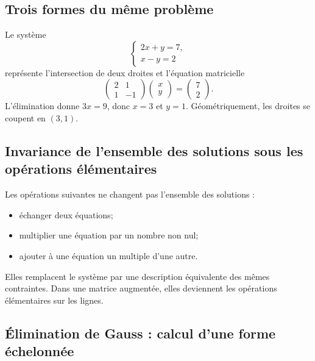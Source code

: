 \subsection{Trois formes du même problème}

Le système
\[
\begin{cases}
2x+y=7,\\
x-y=2
\end{cases}
\]
représente l'intersection de deux droites et l'équation matricielle
\[
\begin{pmatrix}2&1\\1&-1\end{pmatrix}
\begin{pmatrix}x\\y\end{pmatrix}
=
\begin{pmatrix}7\\2\end{pmatrix}.
\]
L'élimination donne $3x=9$, donc $x=3$ et $y=1$. Géométriquement, les droites se coupent en $(3,1)$.

\subsection{Invariance de l'ensemble des solutions sous les opérations élémentaires}

Les opérations suivantes ne changent pas l'ensemble des solutions :
\begin{itemize}
\item échanger deux équations;
\item multiplier une équation par un nombre non nul;
\item ajouter à une équation un multiple d'une autre.
\end{itemize}
Elles remplacent le système par une description équivalente des mêmes contraintes. Dans une matrice augmentée, elles deviennent les opérations élémentaires sur les lignes.

\subsection{Élimination de Gauss : calcul d'une forme échelonnée}

